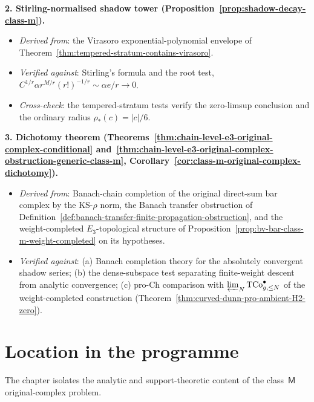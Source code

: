 \textbf{2. Stirling-normalised shadow tower
(Proposition~\ref{prop:shadow-decay-class-m}).}
\begin{itemize}[nosep]
\item \emph{Derived from}: the Virasoro exponential-polynomial
 envelope of
 Theorem~\ref{thm:tempered-stratum-contains-virasoro}.
\item \emph{Verified against}: Stirling's formula and the root test,
 $C^{1/r}\alpha r^{M/r}(r!)^{-1/r}\sim \alpha e/r\to 0$.
\item \emph{Cross-check}: the tempered-stratum tests verify the
 zero-limsup conclusion and the ordinary radius
 $\rho_*(c)=\lvert c\rvert/6$.
\end{itemize}

\textbf{3. Dichotomy theorem
(Theorems~\ref{thm:chain-level-e3-original-complex-conditional}
and~\ref{thm:chain-level-e3-original-complex-obstruction-generic-class-m},
Corollary~\ref{cor:class-m-original-complex-dichotomy}).}
\begin{itemize}[nosep]
\item \emph{Derived from}: Banach-chain completion of the original
 direct-sum bar complex by the KS-$\rho$ norm, the Banach transfer
 obstruction of
 Definition~\ref{def:banach-transfer-finite-propagation-obstruction},
 and the weight-completed $E_3$-topological structure of
 Proposition~\ref{prop:bv-bar-class-m-weight-completed} on its
 hypotheses.
\item \emph{Verified against}: (a) Banach completion theory for the
 absolutely convergent shadow series; (b) the dense-subspace test
 separating finite-weight descent from analytic convergence;
 (c) pro-$\mathrm{Ch}$ comparison with
 $\varprojlim_N \mathrm{TCo}^{\bullet}_{g,\le N}$ of the
 weight-completed construction
 (Theorem~\ref{thm:curved-dunn-pro-ambient-H2-zero}).
\end{itemize}

\section{Location in the programme}
\label{sec:original-complex-location}

The chapter isolates the analytic and support-theoretic content of
the class~$\mathsf{M}$ original-complex problem.


